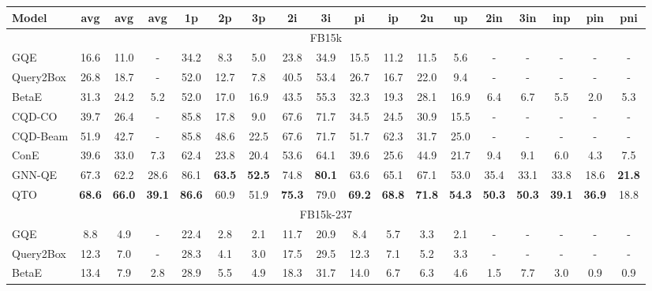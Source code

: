 \begin{table*}[!h]
    \centering
    \begin{adjustbox}{width=\textwidth}
    \begin{tabular}{lccccccccccccccccc}
        \toprule
        \bf{Model} & \bf{avg} & \bf{avg} & \bf{avg} & \bf{1p} & \bf{2p} & \bf{3p} & \bf{2i} & \bf{3i} & \bf{pi} & \bf{ip} & \bf{2u} & \bf{up} & \bf{2in} & \bf{3in} & \bf{inp} & \bf{pin} & \bf{pni} \\
        \midrule
        \multicolumn{18}{c}{FB15k} \\
        \midrule
        GQE & 16.6 & 11.0 & - & 34.2 & 8.3 & 5.0 & 23.8 & 34.9 & 15.5 & 11.2 & 11.5 & 5.6 & - & - & - & - & - \\
        Query2Box & 26.8 & 18.7 & - & 52.0 & 12.7 & 7.8 & 40.5 & 53.4 & 26.7 & 16.7 & 22.0 & 9.4 & - & - & - & - & - \\
        BetaE & 31.3 & 24.2 & 5.2 & 52.0 & 17.0 & 16.9 & 43.5 & 55.3 & 32.3 & 19.3 & 28.1 & 16.9 & 6.4 & 6.7 & 5.5 & 2.0 & 5.3 \\
        CQD-CO & 39.7 & 26.4 & - & 85.8 & 17.8 & 9.0 & 67.6 & 71.7 & 34.5 & 24.5 & 30.9 & 15.5 & - & - & - & - & - \\
        CQD-Beam & 51.9 & 42.7 & - & 85.8 & 48.6 & 22.5 & 67.6 & 71.7 & 51.7 & 62.3 & 31.7 & 25.0 & - & - & - & - & - \\
        ConE & 39.6 & 33.0 & 7.3 & 62.4 & 23.8 & 20.4 & 53.6 & 64.1 & 39.6 & 25.6 & 44.9 & 21.7 & 9.4 & 9.1 & 6.0 & 4.3 & 7.5 \\
        GNN-QE & 67.3 & 62.2 & 28.6 & 86.1 & \bf{63.5} & \bf{52.5} & 74.8 & \bf{80.1} & 63.6 & 65.1 & 67.1 & 53.0 & 35.4 & 33.1 & 33.8 & 18.6 & \bf{21.8} \\
        \midrule
        QTO & \bf{68.6} & \bf{66.0} & \bf{39.1} & \bf{86.6} & 60.9 & 51.9 & \bf{75.3} & 79.0 & \bf{69.2} & \bf{68.8} & \bf{71.8} & \bf{54.3} & \bf{50.3} & \bf{50.3} & \bf{39.1} & \bf{36.9} & 18.8 \\
        \midrule[0.08em]
        \multicolumn{18}{c}{FB15k-237} \\
        \midrule
        GQE & 8.8 & 4.9 & - & 22.4 & 2.8 & 2.1 & 11.7 & 20.9 & 8.4 & 5.7 & 3.3 & 2.1 & - & - & - & - & - \\
        Query2Box & 12.3 & 7.0 & - & 28.3 & 4.1 & 3.0 & 17.5 & 29.5 & 12.3 & 7.1 & 5.2 & 3.3 & - & - & - & - & - \\
        BetaE & 13.4 & 7.9 & 2.8 & 28.9 & 5.5 & 4.9 & 18.3 & 31.7 & 14.0 & 6.7 & 6.3 & 4.6 & 1.5 & 7.7 & 3.0 & 0.9 & 0.9 \\

\end{tabular}
\end{adjustbox}
\end{table*}
